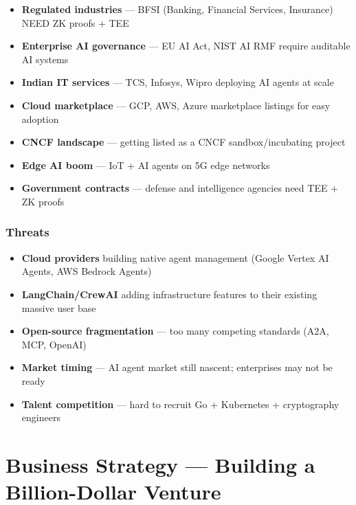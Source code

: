 \documentclass[12pt,a4paper,openany]{report}
\begin{document}
\begin{itemize}[label=\textcolor{agentk-blue}{\textbf{$\rightarrow$}}]
    \item \textbf{Regulated industries} — BFSI (Banking, Financial Services, Insurance) NEED ZK proofs + TEE
    \item \textbf{Enterprise AI governance} — EU AI Act, NIST AI RMF require auditable AI systems
    \item \textbf{Indian IT services} — TCS, Infosys, Wipro deploying AI agents at scale
    \item \textbf{Cloud marketplace} — GCP, AWS, Azure marketplace listings for easy adoption
    \item \textbf{CNCF landscape} — getting listed as a CNCF sandbox/incubating project
    \item \textbf{Edge AI boom} — IoT + AI agents on 5G edge networks
    \item \textbf{Government contracts} — defense and intelligence agencies need TEE + ZK proofs
\end{itemize}

\section{Threats}

\begin{itemize}[label=\textcolor{agentk-orange}{\textbf{!}}]
    \item \textbf{Cloud providers} building native agent management (Google Vertex AI Agents, AWS Bedrock Agents)
    \item \textbf{LangChain/CrewAI} adding infrastructure features to their existing massive user base
    \item \textbf{Open-source fragmentation} — too many competing standards (A2A, MCP, OpenAI)
    \item \textbf{Market timing} — AI agent market still nascent; enterprises may not be ready
    \item \textbf{Talent competition} — hard to recruit Go + Kubernetes + cryptography engineers
\end{itemize}


\part{Business Strategy — Building a Billion-Dollar Venture}
\end{document}
